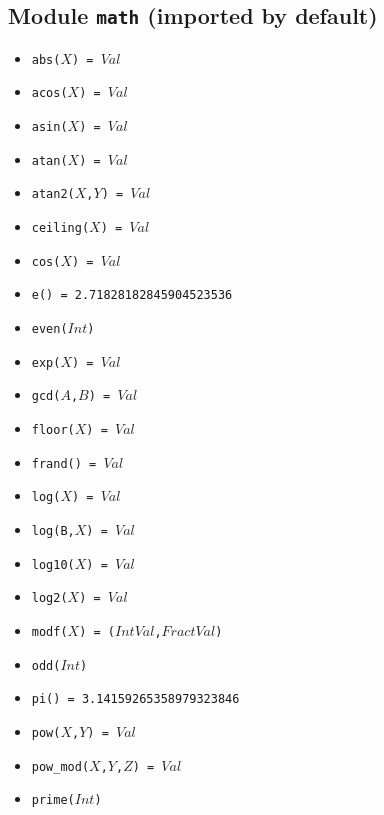 \documentclass[10pt]{article}
\begin{document}
\begin{multicols}{2}
%
\section*{Module \texttt{math} (imported by default)}
\begin{scriptsize}
\begin{itemize}
   \item \texttt{abs($X$) = $Val$} 
   \item \texttt{acos($X$) = $Val$} 
   \item \texttt{asin($X$) = $Val$}
   \item \texttt{atan($X$) = $Val$}
   \item \texttt{atan2($X$,$Y$) = $Val$}
   \item \texttt{ceiling($X$) = $Val$} 
   \item \texttt{cos($X$) = $Val$} 
   \item \texttt{e() = 2.71828182845904523536} 
   \item \texttt{even($Int$)} 
   \item \texttt{exp($X$) = $Val$} 
   \item \texttt{gcd($A$,$B$) = $Val$} 
   \item \texttt{floor($X$) = $Val$} 
   \item \texttt{frand() = $Val$} 
   \item \texttt{log($X$) = $Val$}
   \item \texttt{log(B,$X$) = $Val$} 
   \item \texttt{log10($X$) = $Val$} 
   \item \texttt{log2($X$) = $Val$} 
   \item \texttt{modf($X$) = ($IntVal$,$FractVal$)} 
   \item \texttt{odd($Int$)} 
   \item \texttt{pi() = 3.14159265358979323846} 
   \item \texttt{pow($X$,$Y$) = $Val$}
   \item \texttt{pow\_mod($X$,$Y$,$Z$) = $Val$}
   \item \texttt{prime($Int$)} 

\end{itemize}
\end{scriptsize}
\end{multicols}
\end{document}
